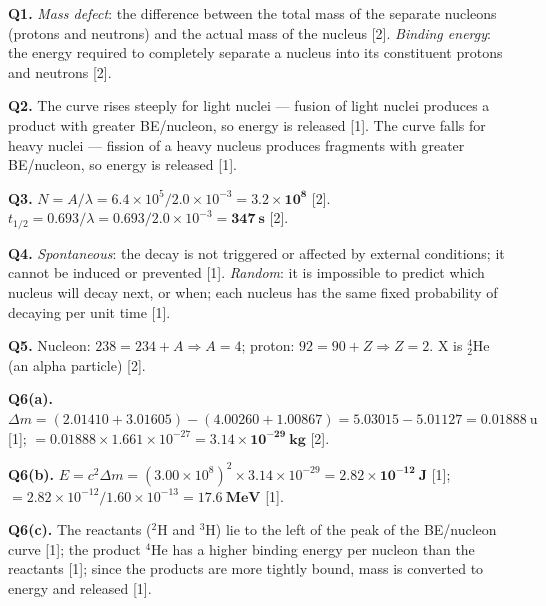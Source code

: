 \begin{markscheme}

\textbf{Q1.} \textit{Mass defect}: the difference between the total mass of the separate nucleons (protons and neutrons) and the actual mass of the nucleus [2]. \textit{Binding energy}: the energy required to completely separate a nucleus into its constituent protons and neutrons [2].

\vspace{0.5em}\textbf{Q2.} The curve rises steeply for light nuclei — fusion of light nuclei produces a product with greater BE/nucleon, so energy is released [1]. The curve falls for heavy nuclei — fission of a heavy nucleus produces fragments with greater BE/nucleon, so energy is released [1].

\vspace{0.5em}\textbf{Q3.} $N = A/\lambda = 6.4\times10^5 / 2.0\times10^{-3} = \mathbf{3.2\times10^8}$ [2]. $t_{1/2} = 0.693/\lambda = 0.693/2.0\times10^{-3} = \mathbf{347\ \text{s}}$ [2].

\vspace{0.5em}\textbf{Q4.} \textit{Spontaneous}: the decay is not triggered or affected by external conditions; it cannot be induced or prevented [1]. \textit{Random}: it is impossible to predict which nucleus will decay next, or when; each nucleus has the same fixed probability of decaying per unit time [1].

\vspace{0.5em}\textbf{Q5.} Nucleon: $238 = 234 + A \Rightarrow A = 4$; proton: $92 = 90 + Z \Rightarrow Z = 2$. X is $^4_2\text{He}$ (an alpha particle) [2].

\vspace{0.5em}\textbf{Q6(a).} $\Delta m = (2.01410 + 3.01605) - (4.00260 + 1.00867) = 5.03015 - 5.01127 = 0.01888\ \text{u}$ [1]; $= 0.01888 \times 1.661\times10^{-27} = \mathbf{3.14\times10^{-29}\ \text{kg}}$ [2].

\vspace{0.5em}\textbf{Q6(b).} $E = c^2\Delta m = (3.00\times10^8)^2 \times 3.14\times10^{-29} = \mathbf{2.82\times10^{-12}\ \text{J}}$ [1]; $= 2.82\times10^{-12}/1.60\times10^{-13} = \mathbf{17.6\ \text{MeV}}$ [1].

\vspace{0.5em}\textbf{Q6(c).} The reactants ($^2$H and $^3$H) lie to the left of the peak of the BE/nucleon curve [1]; the product $^4$He has a higher binding energy per nucleon than the reactants [1]; since the products are more tightly bound, mass is converted to energy and released [1].


\end{markscheme}
